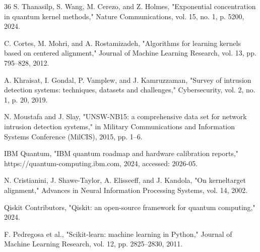 \begin{thebibliography}{36}
S. Thanasilp, S. Wang, M. Cerezo, and Z. Holmes, "Exponential concentration in quantum kernel methods," Nature Communications, vol. 15, no. 1, p. 5200, 2024.

C. Cortes, M. Mohri, and A. Rostamizadeh, "Algorithms for learning kernels based on centered alignment," Journal of Machine Learning Research, vol. 13, pp. 795--828, 2012.

A. Khraisat, I. Gondal, P. Vamplew, and J. Kamruzzaman, "Survey of intrusion detection systems: techniques, datasets and challenges," Cybersecurity, vol. 2, no. 1, p. 20, 2019.

N. Moustafa and J. Slay, "UNSW-NB15: a comprehensive data set for network intrusion detection systems," in Military Communications and Information Systems Conference (MilCIS), 2015, pp. 1--6.

%

IBM Quantum, "IBM quantum roadmap and hardware calibration reports," https://quantum-computing.ibm.com, 2024, accessed: 2026-05.

N. Cristianini, J. Shawe-Taylor, A. Elisseeff, and J. Kandola, "On kerneltarget alignment," Advances in Neural Information Processing Systems, vol. 14, 2002.

Qiskit Contributors, "Qiskit: an open-source framework for quantum computing," 2024.

F. Pedregosa et al., "Scikit-learn: machine learning in Python," Journal of Machine Learning Research, vol. 12, pp. 2825--2830, 2011.


\end{thebibliography}

